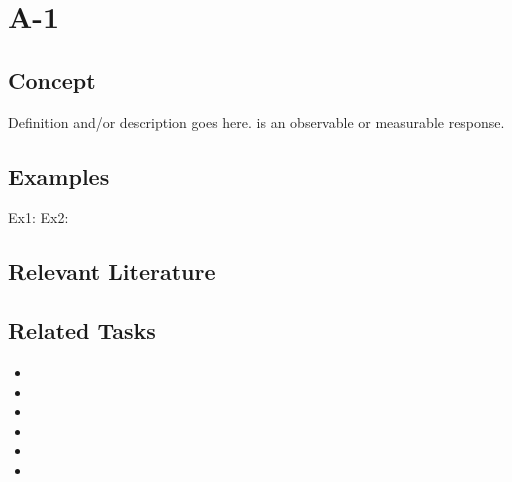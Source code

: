 \chapter{A-1}
{\Large{\aOne{}}}

\section{Concept}
Definition and/or description goes here.
\lipsum[1-4]
is an observable or measurable response.
\section{Examples}
Ex1: \lipsum[1-3]
Ex2: \lipsum[1-3]

\section{Relevant Literature}

\begin{refsection}
\nocite{test,alang2017police,clayton2018black}
\printbibliography[heading=subbibliography]
\end{refsection}


%

\section{Related Tasks}
\begin{itemize}
\item \secOne{}
\item \seca{}
\item \aTwo{}
\item \aThree{}
\item \aFour{}
\item \aFive{}
\end{itemize} 

